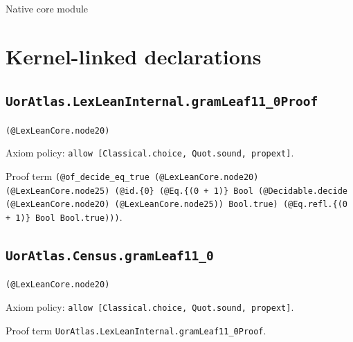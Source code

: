 \documentclass[11pt]{article}
\begin{document}
\begin{center}{\LARGE Native core module}\end{center}
\section*{Kernel-linked declarations}
\subsection*{\texttt{UorAtlas.LexLeanInternal.gramLeaf11\_0Proof}}
\noindent\texttt{(@LexLeanCore.node20)}\par
\noindent Axiom policy: \texttt{allow [Classical.choice, Quot.sound, propext]}.\par
\noindent Proof term \texttt{(@of\_decide\_eq\_true (@LexLeanCore.node20) (@LexLeanCore.node25) (@id.\{0\} (@Eq.\{(0 + 1)\} Bool (@Decidable.decide (@LexLeanCore.node20) (@LexLeanCore.node25)) Bool.true) (@Eq.refl.\{(0 + 1)\} Bool Bool.true)))}.\par
\subsection*{\texttt{UorAtlas.Census.gramLeaf11\_0}}
\noindent\texttt{(@LexLeanCore.node20)}\par
\noindent Axiom policy: \texttt{allow [Classical.choice, Quot.sound, propext]}.\par
\noindent Proof term \texttt{UorAtlas.LexLeanInternal.gramLeaf11\_0Proof}.\par
\end{document}
